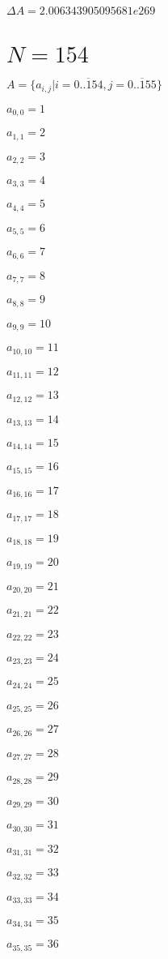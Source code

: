 \documentclass[a4paper,12pt]{article}
\begin{document}
$\Delta A = 2.006343905095681e269$



\section{ $N = 154$ }
$A = \{ a _{ i, j } | i = \overline { 0..154 }, j = \overline { 0..155 } \}$

$a _{ 0, 0 } = 1$

$a _{ 1, 1 } = 2$

$a _{ 2, 2 } = 3$

$a _{ 3, 3 } = 4$

$a _{ 4, 4 } = 5$

$a _{ 5, 5 } = 6$

$a _{ 6, 6 } = 7$

$a _{ 7, 7 } = 8$

$a _{ 8, 8 } = 9$

$a _{ 9, 9 } = 10$

$a _{ 10, 10 } = 11$

$a _{ 11, 11 } = 12$

$a _{ 12, 12 } = 13$

$a _{ 13, 13 } = 14$

$a _{ 14, 14 } = 15$

$a _{ 15, 15 } = 16$

$a _{ 16, 16 } = 17$

$a _{ 17, 17 } = 18$

$a _{ 18, 18 } = 19$

$a _{ 19, 19 } = 20$

$a _{ 20, 20 } = 21$

$a _{ 21, 21 } = 22$

$a _{ 22, 22 } = 23$

$a _{ 23, 23 } = 24$

$a _{ 24, 24 } = 25$

$a _{ 25, 25 } = 26$

$a _{ 26, 26 } = 27$

$a _{ 27, 27 } = 28$

$a _{ 28, 28 } = 29$

$a _{ 29, 29 } = 30$

$a _{ 30, 30 } = 31$

$a _{ 31, 31 } = 32$

$a _{ 32, 32 } = 33$

$a _{ 33, 33 } = 34$

$a _{ 34, 34 } = 35$

$a _{ 35, 35 } = 36$
\end{document}
